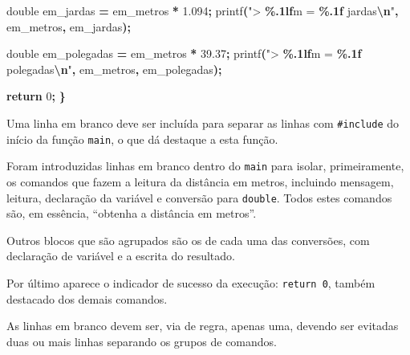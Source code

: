 \documentclass[
  11pt,
  a4paper,
]{scrbook}
\newenvironment{Shaded}{\begin{snugshade}}{\end{snugshade}}
\newcommand{\ControlFlowTok}[1]{\textcolor[rgb]{0.13,0.29,0.53}{\textbf{#1}}}
\newcommand{\DataTypeTok}[1]{\textcolor[rgb]{0.13,0.29,0.53}{#1}}
\newcommand{\DecValTok}[1]{\textcolor[rgb]{0.00,0.00,0.81}{#1}}
\newcommand{\FloatTok}[1]{\textcolor[rgb]{0.00,0.00,0.81}{#1}}
\newcommand{\NormalTok}[1]{#1}
\newcommand{\OperatorTok}[1]{\textcolor[rgb]{0.81,0.36,0.00}{\textbf{#1}}}
\newcommand{\SpecialCharTok}[1]{\textcolor[rgb]{0.81,0.36,0.00}{\textbf{#1}}}
\newcommand{\StringTok}[1]{\textcolor[rgb]{0.31,0.60,0.02}{#1}}
\begin{document}
\begin{Shaded}
\begin{Highlighting}[]
    \DataTypeTok{double}\NormalTok{ em\_jardas }\OperatorTok{=}\NormalTok{ em\_metros }\OperatorTok{*} \FloatTok{1.094}\OperatorTok{;}
\NormalTok{    printf}\OperatorTok{(}\StringTok{"\textgreater{} }\SpecialCharTok{\%.1lf}\StringTok{m = }\SpecialCharTok{\%.1f}\StringTok{ jardas}\SpecialCharTok{\textbackslash{}n}\StringTok{"}\OperatorTok{,}\NormalTok{ em\_metros}\OperatorTok{,}\NormalTok{ em\_jardas}\OperatorTok{);}

    \DataTypeTok{double}\NormalTok{ em\_polegadas }\OperatorTok{=}\NormalTok{ em\_metros }\OperatorTok{*} \FloatTok{39.37}\OperatorTok{;}
\NormalTok{    printf}\OperatorTok{(}\StringTok{"\textgreater{} }\SpecialCharTok{\%.1lf}\StringTok{m = }\SpecialCharTok{\%.1f}\StringTok{ polegadas}\SpecialCharTok{\textbackslash{}n}\StringTok{"}\OperatorTok{,}\NormalTok{ em\_metros}\OperatorTok{,}\NormalTok{ em\_polegadas}\OperatorTok{);}

    \ControlFlowTok{return} \DecValTok{0}\OperatorTok{;}
\OperatorTok{\}}
\end{Highlighting}
\end{Shaded}

Uma linha em branco deve ser incluída para separar as linhas com
\texttt{\#include} do início da função \texttt{main}, o que dá destaque
a esta função.

Foram introduzidas linhas em branco dentro do \texttt{main} para isolar,
primeiramente, os comandos que fazem a leitura da distância em metros,
incluindo mensagem, leitura, declaração da variável e conversão para
\texttt{double}. Todos estes comandos são, em essência, ``obtenha a
distância em metros''.

Outros blocos que são agrupados são os de cada uma das conversões, com
declaração de variável e a escrita do resultado.

Por último aparece o indicador de sucesso da execução:
\texttt{return\ 0}, também destacado dos demais comandos.

\begin{tcolorbox}[enhanced jigsaw, arc=.35mm, bottomtitle=1mm, colbacktitle=quarto-callout-tip-color!10!white, title=\textcolor{quarto-callout-tip-color}{\faLightbulb}\hspace{0.5em}{Dica}, toprule=.15mm, left=2mm, opacityback=0, colback=white, colframe=quarto-callout-tip-color-frame, opacitybacktitle=0.6, bottomrule=.15mm, leftrule=.75mm, toptitle=1mm, coltitle=black, titlerule=0mm, rightrule=.15mm, breakable]

As linhas em branco devem ser, via de regra, apenas uma, devendo ser
evitadas duas ou mais linhas separando os grupos de comandos.

\end{tcolorbox}
\end{document}
